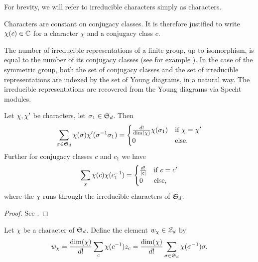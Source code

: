 For brevity, we will refer to irreducible characters simply as characters. 

\begin{rmk}
 Characters are constant on conjugacy classes. It is therefore justified to write $\chi(c)\in\mathbb{C}$ for a character $\chi$ and a conjugacy class $c$.
\end{rmk}

\begin{rmk}
 The number of irreducible representations of a finite group, up to isomorphism, is equal to the number of its conjugacy classes (see for example \cite[p. 19, Thm. 7]{Serre77}). In the case of the symmetric group, both the set of conjugacy classes and the set of irreducible representations are indexed by the set of Young diagrams, in a natural way. The irreducible representations are recovered from the Young diagrams via Specht modules.
\end{rmk}

\begin{prop}\label{pr:orthogonalities}
 Let $\chi, \chi'$ be characters, let $\sigma_1\in\operatorname{\mathfrak{S}}_d$. Then
 \[
  \sum_{\sigma\in\operatorname{\mathfrak{S}}_d}\chi(\sigma)\chi'(\sigma^{-1}\sigma_1) = 
   \begin{cases} \frac{d!}{\dim(\chi)}\chi(\sigma_1) &\mbox{if } \chi = \chi' \\
                                     0 &\mbox{else.}
   \end{cases} 
 \]
 Further for conjugacy classes $c$ and $c_1$ we have
 \[
  \sum_{\chi}\chi(c)\chi(c_1^{-1}) =
   \begin{cases} \frac{d!}{|c|} &\mbox{if } c = c' \\
                                  0 &\mbox{else,}
   \end{cases}
 \]
 where the $\chi$ runs through the irreducible characters of $\operatorname{\mathfrak{S}}_d$.
\end{prop}
\begin{proof}
 See \cite[Thm.\ 2.13 and Thm.\ 2.18]{Isaacs}.
\end{proof}

\begin{defi}
 Let $\chi$ be a character of $\operatorname{\mathfrak{S}}_d$. Define the element $w_\chi \in \mathcal{Z}_d$ by
 \[
  w_\chi = \frac{\dim(\chi)}{d!}\sum_{c}\chi(c^{-1})z_c = \frac{\dim(\chi)}{d!}\sum_{\sigma\in\operatorname{\mathfrak{S}}_d}\chi(\sigma^{-1})\sigma.
 \]
\end{defi}

